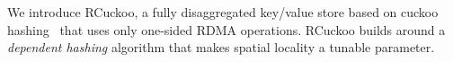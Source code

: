 We introduce RCuckoo, a fully disaggregated key/value store based on
cuckoo hashing~\cite{cuckoo} that
uses only one-sided RDMA operations.
RCuckoo builds
around a \emph{dependent hashing} algorithm that makes spatial
locality a tunable parameter.
%
%
%
%
%
